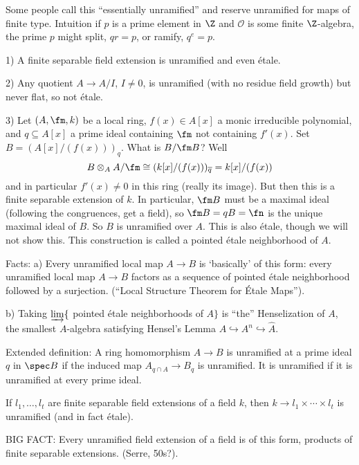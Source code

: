 \begin{rem}
Some people call this ``essentially unramified'' and reserve unramified for maps of finite type. Intuition if $p$ is a prime element in $\Z$ and $\mathcal{O}$ is some finite $\Z$-algebra, the prime $p$ might split, $qr=p$, or ramify, $q^e=p$. 
\end{rem}


\begin{ex}
1) A finite separable field extension is unramified and even \'etale. 

2) Any quotient $A \to A/I$, $I \neq 0$, is unramified (with no residue field growth) but never flat, so not \'etale. 

3) Let $(A,\fm,k)$ be a local ring, $f(x) \in A[x]$ a monic irreducible polynomial, and $q \subseteq A[x]$ a prime ideal containing $\fm$ not containing $f'(x)$. Set $B= (A[x]/(f(x)))_q$. What is $B/\fm B$? Well
	\[
	B \otimes_A A/\fm \cong (k[x]/(f(x)))_{\overline{q}}= k[x]/(f(x))
	\]
and in particular $f'(x) \neq 0$ in this ring (really its image). But then this is a finite separable extension of $k$. In particular, $\fm B$ must be a maximal ideal (following the congruences, get a field), so $\fm B= qB=\fn$ is the unique maximal ideal of $B$. So $B$ is unramified over $A$. This is also \'etale, though we will not show this. This construction is called a pointed \'etale neighborhood of $A$. 
\end{ex}


Facts: 
a) Every unramified local map $A \to B$ is `basically' of this form: every unramified local map $A \to B$ factors as a sequence of pointed \'etale neighborhood followed by a surjection. (``Local Structure Theorem for \'Etale Maps''). 

b) Taking $\varinjlim \{$ pointed \'etale neighborhoods of $A\}$ is ``the'' Henselization of $A$, the smallest $A$-algebra satisfying Hensel's Lemma $A \hookrightarrow A^n \hookrightarrow \widehat{A}$. 


Extended definition: A ring homomorphism $A \to B$ is unramified at a prime ideal $q$ in $\spec B$ if the induced map $A_{q \cap A} \to B_q$ is unramified. It is unramified if it is unramified at every prime ideal. 


\begin{ex}
If $l_1, \ldots, l_t$ are finite separable field extensions of a field $k$, then $k \to l_1 \times \cdots \times l_t$ is unramified (and in fact \'etale). 
\end{ex}


BIG FACT: Every unramified field extension of a field is of this form, products of finite separable extensions. (Serre, 50s?). 


